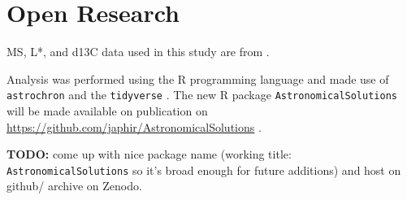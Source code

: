 \documentclass[draft]{agujournal2019}
\begin{document}
%



\section{Open Research}

\Gls{MS}, \gls{L*}, and \gls{d13C} data used in this study are from
.

Analysis was performed using the R programming language \cite{RCoreTeam2020}
and made use of \texttt{astrochron}  and the
\texttt{tidyverse} . The new R package
\texttt{AstronomicalSolutions} will be made available on publication on
\url{https://github.com/japhir/AstronomicalSolutions} .

\textbf{TODO:} come up with nice package name (working title:
\texttt{AstronomicalSolutions} so it's broad enough for future additions) and host on github/ archive on
Zenodo.




\end{document}
